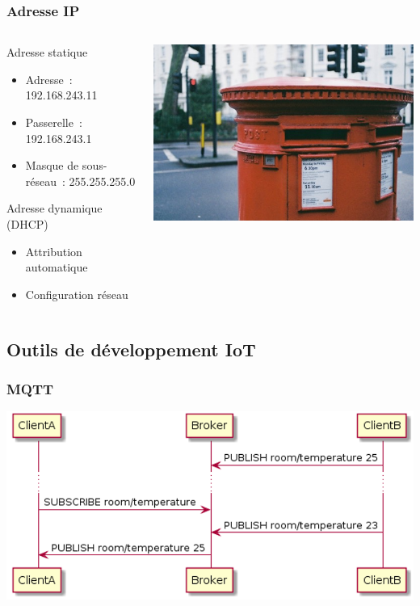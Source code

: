 \documentclass[aspectratio=169,utf8,french]{beamer}
\begin{document}
\begin{frame}
  \frametitle{Adresse IP}
  \begin{columns}
    \begin{column}{0.6\textwidth}
      Adresse statique
      \begin{itemize}
        \item Adresse~: 192.168.243.11
        \item Passerelle~: 192.168.243.1
        \item Masque de sous-réseau~: 255.255.255.0
      \end{itemize}
      Adresse dynamique (DHCP)
      \begin{itemize}
        \item Attribution automatique
        \item Configuration réseau
      \end{itemize}
    \end{column}
    \begin{column}{0.4\textwidth}
      \includegraphics[width=\linewidth]{pictures/postbox.jpg}
    \end{column}
  \end{columns}
\end{frame}

\subsection{Outils de développement IoT}

\begin{frame}
  \frametitle{MQTT}
  \begin{center}
    \includegraphics[width=.8\linewidth]{pictures/mqtt.png}
  \end{center}
\end{frame}
\end{document}
